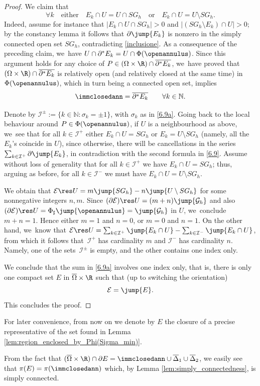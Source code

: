 \begin{proof}
We claim that
\[
\forall k\quad\text{either}\quad E_k\cap U=U \cap SG_h
\quad\text{or} \quad E_k\cap U=U\setminus SG_h.
\]
Indeed, assume for instance that $|E_k\cap U \cap
SG_h|>0$ and $|(SG_h\setminus E_k)\cap U|>0$; by the constancy lemma \cite{Krantz-Parks} it follows that $\partial\jump{E_k}$ is nonzero in the simply connected open set $SG_h$, contradicting \eqref{inclusione}.
As a consequence of the preceding claim, we~have $U\cap \partial^*E_k=U\cap \Phi(\openannulus)$. Since this argument holds for any choice of $P\in (\Omega\times\R)\cap \overline{\partial^*E_k}$, we~have proved that $(\Omega\times\R)\cap \overline{\partial^*E_k}$ is relatively open
(and relatively closed at the same time) in $\Phi(\openannulus)$, which in turn being a connected open set, implies
\[
\immclosedann=\overline{\partial^*E_k}\qquad \forall k\in \mathbb N.
\]

Denote by $\mathcal I^{\pm}:=\{k\in \mathbb N:\sigma_k=\pm1\}$, with
$\sigma_k$ as in \eqref{6.9a}.
Going back to the local behaviour around $P\in \Phi(\openannulus)$, if $U$ is a neighbourhood as above, we~see that for all $k\in \mathcal I^+$ either $E_k\cap U=SG_h$ or $E_k=U\setminus SG_h$ (namely, all the $E_k$'s coincide in $U$), since otherwise, there will be cancellations in the series $\sum_{k\in \mathcal I^+}\partial \jump{E_k}$, in contradiction with the second formula in \eqref{6.9}. Assume without loss of generality that for all $k\in \mathcal I^+$ we have $E_k\cap U=SG_h$; thus, arguing as before, for all $k\in \mathcal I^-$ we must have $E_k\cap U=U\setminus SG_h$.

We obtain that $\mathcal E\res U=m\jump{SG_h}-n\jump{U\setminus SG_h}$
for some nonnegative integers $n,m$. Since $(\partial \mathcal E)\res U=(m+n)\jump{\mathcal G_h}$
and also $(\partial\mathcal E)\res U=\Phi_\sharp\jump{\openannulus}=\jump{\mathcal G_h}$ in $U$, we~conclude $m+n=1$. Hence either $m=1$
and $n=0$, or $m=0$ and $n=1$. On the other hand, we~know that
$\mathcal E\res U=\sum_{k\in \mathcal I^+}\jump{E_k\cap U}-\sum_{k\in \mathcal I^-}\jump{E_k\cap U}$, from which it follows that~$\mathcal I^+$ has cardinality $m$ and $\mathcal I^-$ has cardinality $n$.
Namely, one of the sets~$\mathcal I^\pm$ is empty, and the other contains
one index only.

We conclude that the sum in \eqref{6.9a} involves one index only, that is, there is only one compact set $E$ in $\overline\Omega\times\R$ such that (up to switching the orientation)
\[
\mathcal E=\jump{E}.
\]
This concludes the proof.
\end{proof}
For later convenience, from now on we denote by $E$ the closure of a
precise representative of the set found in Lemma
\ref{lem:region_enclosed_by_Phi(Sigma_min)}.
\begin{remark}\label{rem:steiner-sym}
From the fact that $ (\overline \Omega\times\R)\cap \partial E=\immclosedann\cup\overline\Delta_1\cup\overline\Delta_2$, we
easily see that $\pi( E)=\pi(\immclosedann)$ which, by Lemma \ref{lem:simply_connectedness}, is simply connected.
\end{remark}

